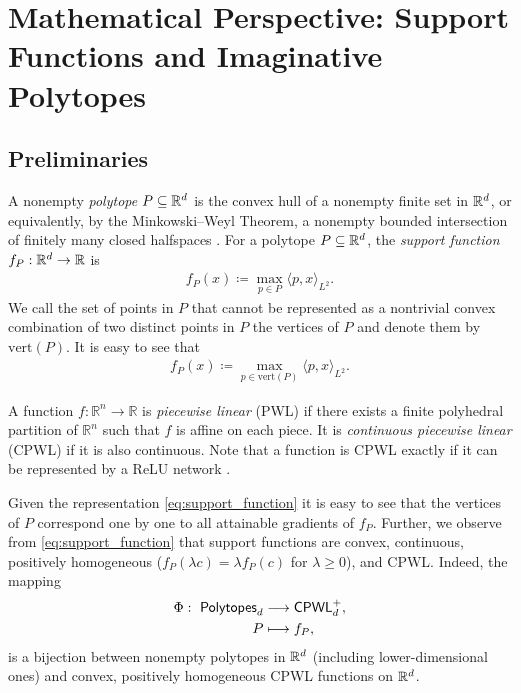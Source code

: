 \section{Mathematical Perspective: Support Functions and Imaginative Polytopes}\label{app:imaginative_polytopes}

\subsection{Preliminaries}\label{subsec:support_app}
A nonempty \emph{polytope} $P\subseteq\mathbb{R}^d$ is the convex hull of a nonempty finite set in $\mathbb{R}^d$, or equivalently, by the Minkowski–Weyl Theorem, a nonempty bounded intersection of finitely many closed halfspaces .
For a polytope $P\subseteq\mathbb{R}^d$, the \emph{support function} $f_P:\mathbb{R}^d\to\mathbb{R}$ is
\begin{align}
    f_P(x) \coloneqq \max_{p\in P} \langle p, x \rangle_{L^2}.
\end{align}
We call the set of points in $P$ that cannot be represented as a nontrivial convex combination of two distinct points in $P$ the vertices of $P$ and denote them by $\text{vert}(P)$.
It is easy to see that
\begin{align}
    f_P(x) \coloneqq \max_{p\in \text{vert}(P)} \langle p, x \rangle_{L^2}. \label{eq:support_function}
\end{align}

A function $f:\mathbb{R}^n \to \mathbb{R}$ is \emph{piecewise linear} (PWL) if there exists a finite polyhedral partition of $\mathbb{R}^n$ such that $f$ is affine on each piece.
It is \emph{continuous piecewise linear} (CPWL) if it is also continuous. 
Note that a function is CPWL exactly if it can be represented by a ReLU network .

Given the representation \cref{eq:support_function} it is easy to see that the vertices of $P$ correspond one by one to all attainable gradients of $f_P$.
Further, we observe from \cref{eq:support_function} that support functions are convex, continuous, positively homogeneous ($f_P(\lambda c)=\lambda f_P(c)$ for $\lambda\ge 0$), and CPWL. Indeed, the mapping
\begin{align}
    \Phi:\ \mathsf{Polytopes}_d &\longrightarrow \mathsf{CPWL}^+_d, \notag \\
    P &\longmapsto f_P, \label{eq:bijection_cpwl}
\end{align}
is a bijection between nonempty polytopes in $\mathbb{R}^d$ (including lower-dimensional ones) and convex, positively homogeneous CPWL functions on $\mathbb{R}^d$.

